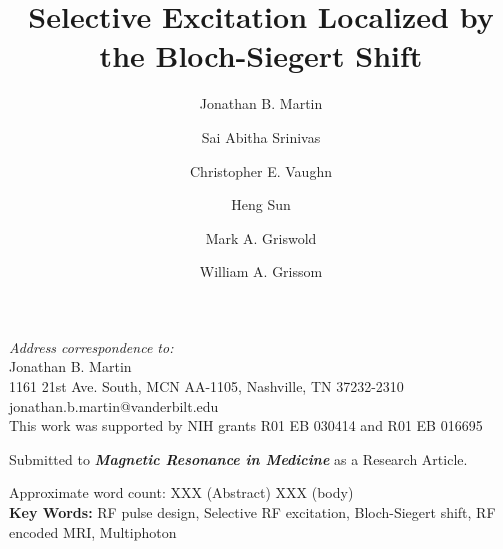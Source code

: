 \documentclass{article}
\begin{document}
\title{\vspace{-2cm}Selective Excitation Localized by the Bloch-Siegert Shift}
\date{}

\author[1,2]{Jonathan B. Martin}
\author[1,2]{Sai Abitha Srinivas}
\author[1,2]{Christopher E. Vaughn}
\author[2]{Heng Sun}
\author[3,4]{Mark A. Griswold}
\author[1,2,5]{William A. Grissom}


\maketitle

\vfill
\noindent

\noindent
\textit{Address correspondence to:} \\
  Jonathan B. Martin \\
  1161 21st Ave. South, MCN AA-1105, Nashville, TN 37232-2310 \\
  jonathan.b.martin@vanderbilt.edu\\


\noindent
This work was supported by NIH grants R01 EB 030414 and R01 EB 016695

\noindent
Submitted to \textbf{\textit{Magnetic Resonance in Medicine}} as a Research Article.

\noindent
Approximate word count: XXX (Abstract) XXX (body)\\

\noindent
\textbf{Key Words:} RF pulse design, Selective RF excitation, Bloch-Siegert shift, RF encoded MRI, Multiphoton

\clearpage
\end{document}
